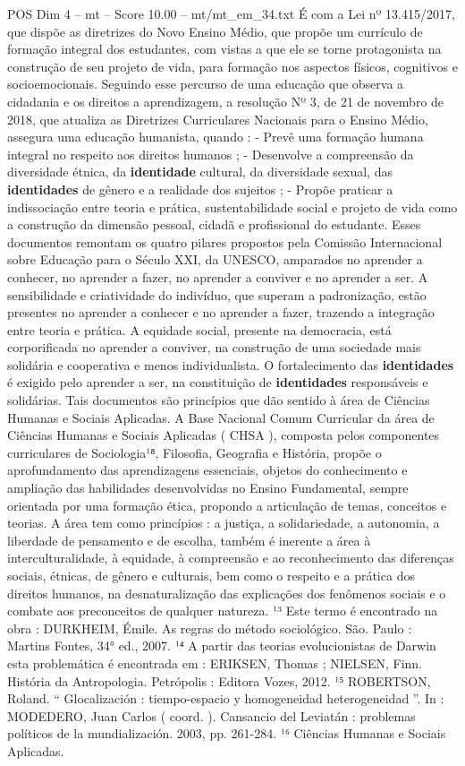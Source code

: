 \begin{textsample}{POS Dim 4 – mt – Score 10.00 – mt/mt\_em\_34.txt}
É com a Lei nº 13.415/2017, que dispõe as diretrizes do Novo Ensino Médio, que propõe um currículo de formação integral dos estudantes, com vistas a que ele se torne protagonista na construção de seu projeto de vida, para formação nos aspectos físicos, cognitivos e socioemocionais.
Seguindo esse percurso de uma educação que observa a cidadania e os direitos a aprendizagem, a resolução Nº 3, de 21 de novembro de 2018, que atualiza as Diretrizes Curriculares Nacionais para o Ensino Médio, assegura uma educação humanista, quando : - Prevê uma formação humana integral no respeito aos direitos humanos ; - Desenvolve a compreensão da diversidade étnica, da \textbf{identidade} cultural, da diversidade sexual, das \textbf{identidades} de gênero e a realidade dos sujeitos ; - Propõe praticar a indissociação entre teoria e prática, sustentabilidade social e projeto de vida como a construção da dimensão pessoal, cidadã e profissional do estudante.
Esses documentos remontam os quatro pilares propostos pela Comissão Internacional sobre Educação para o Século XXI, da UNESCO, amparados no aprender a conhecer, no aprender a fazer, no aprender a conviver e no aprender a ser.
A sensibilidade e criatividade do indivíduo, que superam a padronização, estão presentes no aprender a conhecer e no aprender a fazer, trazendo a integração entre teoria e prática.
A equidade social, presente na democracia, está corporificada no aprender a conviver, na construção de uma sociedade mais solidária e cooperativa e menos individualista.
O fortalecimento das \textbf{identidades} é exigido pelo aprender a ser, na constituição de \textbf{identidades} responsáveis e solidárias.
Tais documentos são princípios que dão sentido à área de Ciências Humanas e Sociais Aplicadas.
A Base Nacional Comum Curricular da área de Ciências Humanas e Sociais Aplicadas ( CHSA ), composta pelos componentes curriculares de Sociologia¹⁸, Filosofia, Geografia e História, propõe o aprofundamento das aprendizagens essenciais, objetos do conhecimento e ampliação das habilidades desenvolvidas no Ensino Fundamental, sempre orientada por uma formação ética, propondo a articulação de temas, conceitos e teorias.
A área tem como princípios : a justiça, a solidariedade, a autonomia, a liberdade de pensamento e de escolha, também é inerente a área à interculturalidade, à equidade, à compreensão e ao reconhecimento das diferenças sociais, étnicas, de gênero e culturais, bem como o respeito e a prática dos direitos humanos, na desnaturalização das explicações dos fenômenos sociais e o combate aos preconceitos de qualquer natureza. ¹³ Este termo é encontrado na obra : DURKHEIM, Émile.
As regras do método sociológico.
São.
Paulo : Martins Fontes, 34{\EmojiFont °} ed., 2007. ¹⁴ A partir das teorias evolucionistas de Darwin esta problemática é encontrada em : ERIKSEN, Thomas ; NIELSEN, Finn.
História da Antropologia.
Petrópolis : Editora Vozes, 2012. ¹⁵ ROBERTSON, Roland. “ Glocalización : tiempo-espacio y homogeneidad heterogeneidad ”.
In : MODEDERO, Juan Carlos ( coord. ).
Cansancio del Leviatán : problemas políticos de la mundialización. 2003, pp. 261-284. ¹⁶ Ciências Humanas e Sociais Aplicadas.

\end{textsample}
